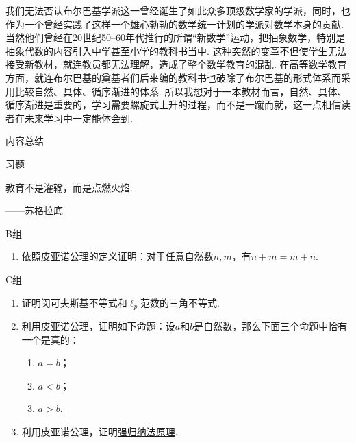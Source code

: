 我们无法否认布尔巴基学派这一曾经诞生了如此众多顶级数学家的学派，同时，也作为一个曾经实践了这样一个雄心勃勃的数学统一计划的学派对数学本身的贡献. 当然他们曾经在20世纪50--60年代推行的所谓``新数学''运动，把抽象数学，特别是抽象代数的内容引入中学甚至小学的教科书当中. 这种突然的变革不但使学生无法接受新教材，就连教员都无法理解，造成了整个数学教育的混乱. 在高等数学教育方面，就连布尔巴基的奠基者们后来编的教科书也破除了布尔巴基的形式体系而采用比较自然、具体、循序渐进的体系. 所以我想对于一本教材而言，自然、具体、循序渐进是重要的，学习需要螺旋式上升的过程，而不是一蹴而就，这一点相信读者在未来学习中一定能体会到.

\vspace{2ex}
\centerline{\heiti \Large 内容总结}

\vspace{2ex}
\centerline{\heiti \Large 习题}

\vspace{2ex}
{\kaishu 教育不是灌输，而是点燃火焰.}
\begin{flushright}
    \kaishu
    ——苏格拉底
\end{flushright}

\centerline{\heiti B组}
\begin{enumerate}
    \item 依照皮亚诺公理的定义证明：对于任意自然数$n,m$，有$n+m=m+n$.
\end{enumerate}

\centerline{\heiti C组}
\begin{enumerate}
    \item 证明闵可夫斯基不等式和$\ell_p$范数的三角不等式.

    \item 利用皮亚诺公理，证明如下命题：设$a$和$b$是自然数，那么下面三个命题中恰有一个是真的：
          \begin{enumerate}
              \item $a=b$；

              \item $a<b$；

              \item $a>b$.
          \end{enumerate}

    \item 利用皮亚诺公理，证明\hyperref[thm:1e:强归纳法原理]{强归纳法原理}.
\end{enumerate}

\endgroup
